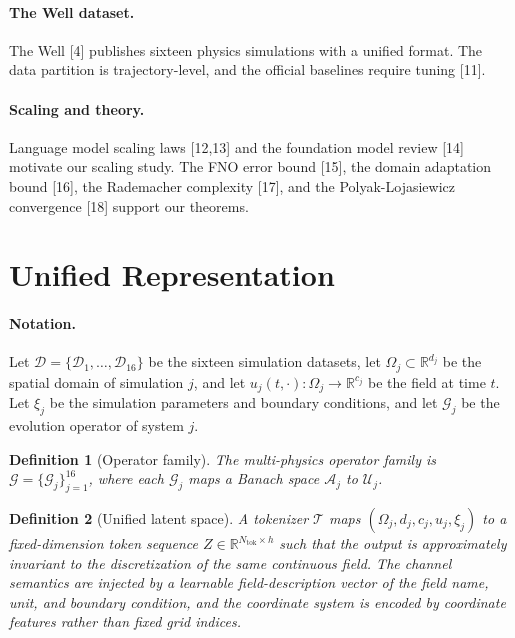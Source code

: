 \documentclass[preprint,12pt]{elsarticle}
\newtheorem{definition}{Definition}
\begin{document}
\paragraph{The Well dataset.} The Well [4] publishes sixteen physics simulations with a unified format. The data partition is trajectory-level, and the official baselines require tuning [11].
\paragraph{Scaling and theory.} Language model scaling laws [12,13] and the foundation model review [14] motivate our scaling study. The FNO error bound [15], the domain adaptation bound [16], the Rademacher complexity [17], and the Polyak-Lojasiewicz convergence [18] support our theorems.

\section{Unified Representation}
\paragraph{Notation.} Let $\mathcal{D}=\{\mathcal{D}_1,\dots,\mathcal{D}_{16}\}$ be the sixteen simulation datasets, let $\Omega_j\subset\mathbb{R}^{d_j}$ be the spatial domain of simulation $j$, and let $u_j(t,\cdot):\Omega_j\to\mathbb{R}^{c_j}$ be the field at time $t$. Let $\xi_j$ be the simulation parameters and boundary conditions, and let $\mathcal{G}_j$ be the evolution operator of system $j$.

\begin{definition}[Operator family]
The multi-physics operator family is $\mathcal{G}=\{\mathcal{G}_j\}_{j=1}^{16}$, where each $\mathcal{G}_j$ maps a Banach space $\mathcal{A}_j$ to $\mathcal{U}_j$.
\end{definition}

\begin{definition}[Unified latent space]
A tokenizer $\mathcal{T}$ maps $(\Omega_j,d_j,c_j,u_j,\xi_j)$ to a fixed-dimension token sequence $Z\in\mathbb{R}^{N_{\mathrm{tok}}\times h}$ such that the output is approximately invariant to the discretization of the same continuous field. The channel semantics are injected by a learnable field-description vector of the field name, unit, and boundary condition, and the coordinate system is encoded by coordinate features rather than fixed grid indices.
\end{definition}
\end{document}

